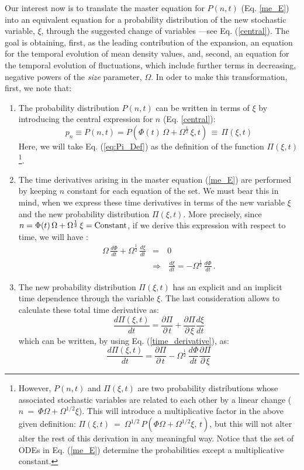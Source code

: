 Our interest now is to translate the master equation for $P(n,t)$ (Eq. \ref{me_E}) into an equivalent equation for a probability distribution of the new stochastic variable, $\xi$, through the suggested change of variables ---see Eq. (\ref{central}). The goal is obtaining, first, as the leading contribution of the expansion, an equation for the temporal evolution of mean density values, and, second, an equation for the temporal evolution of fluctuations, which include further terms in decreasing, negative powers of the {\em size} parameter, $\Omega$. In oder to make this transformation, first, we note that:
\begin{enumerate}
\item The probability distribution $P(n,t)$ can be written in terms of $\xi$ by introducing the central expression for $n$ (Eq. \ref{central}):
\begin{equation}
\label{eq:Pi_Def}
p_n \equiv P(n,t) = P(\Phi(t)\,\Omega + \Omega^{\frac{1}{2}}\,\xi,t)\,\equiv\,\Pi(\xi,t)
\end{equation}
Here, we will take Eq. (\ref{eq:Pi_Def}) as the definition of the function $\Pi(\xi,t)$\footnote{However, $P(n,t)$ and $\Pi(\xi,t)$ are two probability distributions whose associated stochastic variables are related to each other by a linear change ($n~=~\Phi\Omega+\Omega^{1/2}\xi$). This will introduce a multiplicative factor in the above given definition: $\Pi(\xi,t)~=~\Omega^{1/2}\,P(\Phi\Omega+\Omega^{1/2}\xi,\,t)$, but this will not alter alter the rest of this derivation in any meaningful way. Notice that the set of ODEs in Eq. (\ref{me_E}) determine the probabilities except a multiplicative constant.}.     
\item The time derivatives arising in the master equation (\ref{me_E}) are performed by keeping $n$ constant for each equation of the set. We must bear this in mind, when we express these time derivatives in terms of the new variable $\xi$ and the new probability distribution $\Pi(\xi,t)$. More precisely, since $n=\Phi(t)\,\Omega + \Omega^{\frac{1}{2}}\,\xi=\textup{Constant}$, if we derive this expression with respect to time, we will have :
\begin{eqnarray}
\label{time_derivative}
\Omega\,\frac{d\Phi}{dt}+\Omega^{\frac{1}{2}}\,\frac{d\xi}{dt} &=& 0\nonumber\\
 &\Rightarrow&\,\frac{d\xi}{dt}=-\Omega^{\frac{1}{2}}\,\frac{d\Phi}{dt}\,.
\end{eqnarray}
\item The new probability distribution $\Pi(\xi,t)$ has an explicit and an implicit time dependence through the variable $\xi$. The last consideration allows to calculate these total time derivative as:
\begin{equation}
\label{time_derivative_2}
\frac{d\Pi(\xi,t)}{dt}=\frac{\partial\Pi}{\partial\,t} + \frac{\partial\Pi}{\partial\,\xi}\frac{d\xi}{dt} 
\end{equation}
which can be written, by using Eq. (\ref{time_derivative}), as:
\begin{equation}
\frac{d\Pi(\xi,t)}{dt}=\frac{\partial\Pi}{\partial\,t} - \Omega^{\frac{1}{2}}\,\frac{d\Phi}{dt} \frac{\partial\Pi}{\partial\,\xi}	
\label{eq:dPi}
\end{equation}
\end{enumerate}
